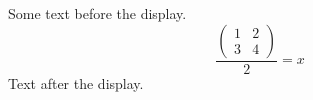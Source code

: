 \documentclass[12pt]{article}
\begin{document}
Some text before the display.
\[ \frac{\begin{pmatrix} 1 & 2 \\ 3 & 4 \end{pmatrix}}{2} = x \]
Text after the display.
\end{document}
